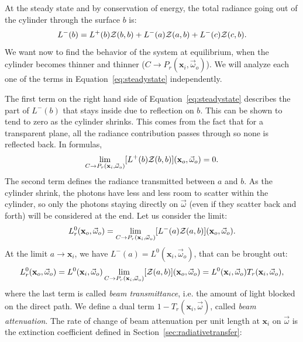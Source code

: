 At the steady state and by conservation of energy, the total radiance going out of the cylinder through the surface $b$ is:
\begin{equation}
\label{eq:steadystate}
L^-(b) = L^+(b)\mathcal{Z}(b,b) + L^-(a)\mathcal{Z}(a,b)  + L^-(c)\mathcal{Z}(c,b).
\end{equation}
We want now to find the behavior of the system at equilibrium, when the cylinder becomes thinner and thinner ($C\rightarrow P_r(\mathbf{x}_i,\vec{\omega}_o)$). We will analyze each one of the terms in Equation~\ref{eq:steadystate} independently. 

The first term on the right hand side of Equation~\ref{eq:steadystate} describes the part of $L^-(b)$ that stays inside due to reflection on $b$. This can be shown to tend to zero as the cylinder shrinks. This comes from the fact that for a transparent plane, all the radiance contribution passes through so none is reflected back. In formulas,
\begin{equation}
\label{eq:zerolimit}
\lim_{C\rightarrow P_r(\mathbf{x}_i,\vec{\omega}_o)} [L^+(b)\mathcal{Z}(b,b)] (\mathbf{x}_o, \vec{\omega}_o) = 0.
\end{equation}
The second term defines the radiance transmitted between $a$ and $b$. As the cylinder shrink, the photons have less and less room to scatter within the cylinder, so only the photons staying directly on $\vec{\omega}$ (even if they scatter back and forth) will be considered at the end. Let us consider the limit:
\begin{equation*}
L_r^0(\mathbf{x}_o, \vec{\omega}_o) = \lim_{C\rightarrow P_r(\mathbf{x}_i,\vec{\omega}_o)} [L^-(a)\mathcal{Z}(a,b)] (\mathbf{x}_o, \vec{\omega}_o).
\end{equation*}
At the limit $a \rightarrow \mathbf{x}_i$, we have $L^-(a) = L^0(\mathbf{x}_i, \vec{\omega}_o)$, that can be brought out: 
\begin{equation}
\label{eq:l0r}
L_r^0(\mathbf{x}_o, \vec{\omega}_o) = L^0(\mathbf{x}_i, \vec{\omega}_o)\lim_{C\rightarrow P_r(\mathbf{x}_i,\vec{\omega}_o)} [\mathcal{Z}(a,b)] (\mathbf{x}_o, \vec{\omega}_o) = L^0(\mathbf{x}_i, \vec{\omega}_o) T_r(\mathbf{x}_i, \vec{\omega}_o),
\end{equation}
where the last term is called \emph{beam transmittance}, i.e. the amount of light blocked on the direct path. We define a dual term $1 -  T_r(\mathbf{x}_i, \vec{\omega})$, called \emph{beam attenuation}. The rate of change of beam attenuation per unit length at $\mathbf{x}_i$ on $\vec{\omega}$ is the extinction coefficient defined in Section~\ref{sec:radiativetransfer}:
